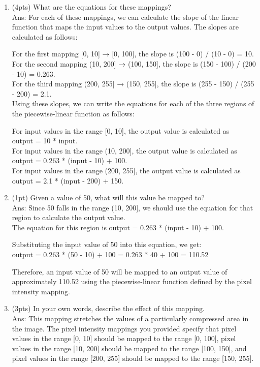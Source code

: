 \documentclass[12pt]{article}
\begin{document}
\begin{enumerate}
\begin{enumerate}
\item (4pts) What are the equations for these mappings?\\
Ans: For each of these mappings, we can calculate the slope of the linear function that maps the input values to the output values. The slopes are calculated as follows:

For the first mapping [0, 10] → [0, 100], the slope is (100 - 0) / (10 - 0) = 10.\\
For the second mapping (10, 200] → (100, 150], the slope is (150 - 100) / (200 - 10) = 0.263.\\
For the third mapping (200, 255] → (150, 255], the slope is (255 - 150) / (255 - 200) = 2.1.\\

Using these slopes, we can write the equations for each of the three regions of the piecewise-linear function as follows:

For input values in the range [0, 10], the output value is calculated as\\ output = 10 * input.\\
For input values in the range (10, 200], the output value is calculated as\\ output = 0.263 * (input - 10) + 100.\\
For input values in the range (200, 255], the output value is calculated as\\ output = 2.1 * (input - 200) + 150.\\

\item (1pt) Given a value of 50, what will this value be mapped to?\\
Ans: Since 50 falls in the range (10, 200], we should use the equation for that region to calculate the output value. \\
The equation for this region is output = 0.263 * (input - 10) + 100.

Substituting the input value of 50 into this equation, we get: \\
output = 0.263 * (50 - 10) + 100 = 0.263 * 40 + 100 = 110.52

Therefore, an input value of 50 will be mapped to an output value of approximately 110.52 using the piecewise-linear function defined by the pixel intensity mapping.\\

\item (3pts) In your own words, describe the effect of this mapping.\\
Ans: This mapping stretches the values of a particularly compressed area in the image. The pixel intensity mappings you provided specify that pixel values in the range [0, 10] should be mapped to the range [0, 100], pixel values in the range [10, 200] should be mapped to the range [100, 150], and pixel values in the range [200, 255] should be mapped to the range [150, 255].


\end{enumerate}
\end{enumerate}
\end{document}
